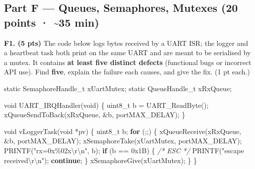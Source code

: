 \documentclass[
  11pt,
]{article}
\newenvironment{Shaded}{}{}
\newcommand{\BaseNTok}[1]{\textcolor[rgb]{0.25,0.63,0.44}{#1}}
\newcommand{\CommentTok}[1]{\textcolor[rgb]{0.38,0.63,0.69}{\textit{#1}}}
\newcommand{\ControlFlowTok}[1]{\textcolor[rgb]{0.00,0.44,0.13}{\textbf{#1}}}
\newcommand{\DataTypeTok}[1]{\textcolor[rgb]{0.56,0.13,0.00}{#1}}
\newcommand{\NormalTok}[1]{#1}
\newcommand{\OperatorTok}[1]{\textcolor[rgb]{0.40,0.40,0.40}{#1}}
\newcommand{\SpecialCharTok}[1]{\textcolor[rgb]{0.25,0.44,0.63}{#1}}
\newcommand{\StringTok}[1]{\textcolor[rgb]{0.25,0.44,0.63}{#1}}
\begin{document}
\subsection{Part F --- Queues, Semaphores, Mutexes (20 points ·
\textasciitilde35
min)}\label{part-f-queues-semaphores-mutexes-20-points-35-min}

\textbf{F1. (5 pts)} The code below logs bytes received by a UART ISR;
the logger and a heartbeat task both print on the same UART and are
meant to be serialised by a mutex. It contains \textbf{at least five
distinct defects} (functional bugs or incorrect API use). Find
\textbf{five}, explain the failure each causes, and give the fix. (1 pt
each.)

\begin{Shaded}
\begin{Highlighting}[]
\DataTypeTok{static}\NormalTok{ SemaphoreHandle\_t xUartMutex}\OperatorTok{;}
\DataTypeTok{static}\NormalTok{ QueueHandle\_t     xRxQueue}\OperatorTok{;}

\DataTypeTok{void}\NormalTok{ UART\_IRQHandler}\OperatorTok{(}\DataTypeTok{void}\OperatorTok{)}
\OperatorTok{\{}
    \DataTypeTok{uint8\_t}\NormalTok{ b }\OperatorTok{=}\NormalTok{ UART\_ReadByte}\OperatorTok{();}
\NormalTok{    xQueueSendToBack}\OperatorTok{(}\NormalTok{xRxQueue}\OperatorTok{,} \OperatorTok{\&}\NormalTok{b}\OperatorTok{,}\NormalTok{ portMAX\_DELAY}\OperatorTok{);}
\OperatorTok{\}}

\DataTypeTok{void}\NormalTok{ vLoggerTask}\OperatorTok{(}\DataTypeTok{void} \OperatorTok{*}\NormalTok{pv}\OperatorTok{)}
\OperatorTok{\{}
    \DataTypeTok{uint8\_t}\NormalTok{ b}\OperatorTok{;}
    \ControlFlowTok{for} \OperatorTok{(;;)} \OperatorTok{\{}
\NormalTok{        xQueueReceive}\OperatorTok{(}\NormalTok{xRxQueue}\OperatorTok{,} \OperatorTok{\&}\NormalTok{b}\OperatorTok{,}\NormalTok{ portMAX\_DELAY}\OperatorTok{);}
\NormalTok{        xSemaphoreTake}\OperatorTok{(}\NormalTok{xUartMutex}\OperatorTok{,}\NormalTok{ portMAX\_DELAY}\OperatorTok{);}
\NormalTok{        PRINTF}\OperatorTok{(}\StringTok{"rx=0x}\SpecialCharTok{\%02x\textbackslash{}r\textbackslash{}n}\StringTok{"}\OperatorTok{,}\NormalTok{ b}\OperatorTok{);}
        \ControlFlowTok{if} \OperatorTok{(}\NormalTok{b }\OperatorTok{==} \BaseNTok{0x1B}\OperatorTok{)} \OperatorTok{\{}                                     \CommentTok{/* ESC */}
\NormalTok{            PRINTF}\OperatorTok{(}\StringTok{"escape received}\SpecialCharTok{\textbackslash{}r\textbackslash{}n}\StringTok{"}\OperatorTok{);}
            \ControlFlowTok{continue}\OperatorTok{;}
        \OperatorTok{\}}
\NormalTok{        xSemaphoreGive}\OperatorTok{(}\NormalTok{xUartMutex}\OperatorTok{);}
    \OperatorTok{\}}
\OperatorTok{\}}


\end{Highlighting}
\end{Shaded}
\end{document}
